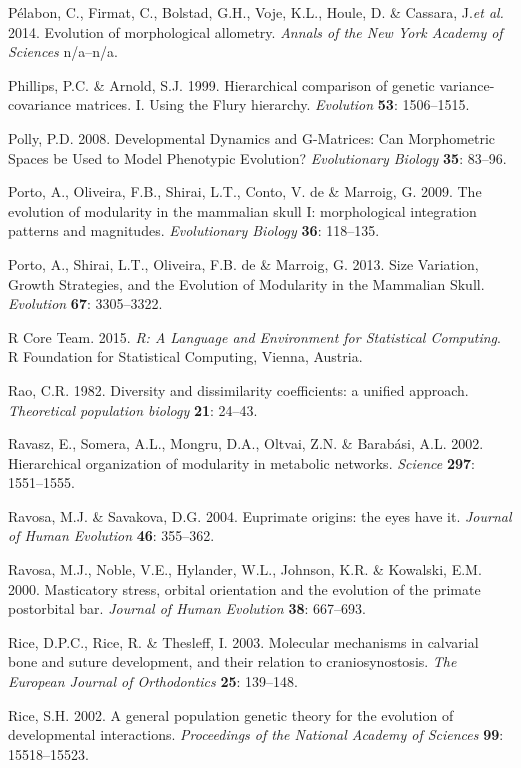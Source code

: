 \documentclass[12pt,twoside]{report}
\begin{document}
Pélabon, C., Firmat, C., Bolstad, G.H., Voje, K.L., Houle, D. \&
Cassara, J.\emph{et al.} 2014. Evolution of morphological allometry.
\emph{Annals of the New York Academy of Sciences} n/a--n/a.

Phillips, P.C. \& Arnold, S.J. 1999. Hierarchical comparison of genetic
variance-covariance matrices. I. Using the Flury hierarchy.
\emph{Evolution} \textbf{53}: 1506--1515.

Polly, P.D. 2008. Developmental Dynamics and G-Matrices: Can
Morphometric Spaces be Used to Model Phenotypic Evolution?
\emph{Evolutionary Biology} \textbf{35}: 83--96.

Porto, A., Oliveira, F.B., Shirai, L.T., Conto, V. de \& Marroig, G.
2009. The evolution of modularity in the mammalian skull I:
morphological integration patterns and magnitudes. \emph{Evolutionary
Biology} \textbf{36}: 118--135.

Porto, A., Shirai, L.T., Oliveira, F.B. de \& Marroig, G. 2013. Size
Variation, Growth Strategies, and the Evolution of Modularity in the
Mammalian Skull. \emph{Evolution} \textbf{67}: 3305--3322.

R Core Team. 2015. \emph{R: A Language and Environment for Statistical
Computing}. R Foundation for Statistical Computing, Vienna, Austria.

Rao, C.R. 1982. Diversity and dissimilarity coefficients: a unified
approach. \emph{Theoretical population biology} \textbf{21}: 24--43.

Ravasz, E., Somera, A.L., Mongru, D.A., Oltvai, Z.N. \& Barabási, A.L.
2002. Hierarchical organization of modularity in metabolic networks.
\emph{Science} \textbf{297}: 1551--1555.

Ravosa, M.J. \& Savakova, D.G. 2004. Euprimate origins: the eyes have
it. \emph{Journal of Human Evolution} \textbf{46}: 355--362.

Ravosa, M.J., Noble, V.E., Hylander, W.L., Johnson, K.R. \& Kowalski,
E.M. 2000. Masticatory stress, orbital orientation and the evolution of
the primate postorbital bar. \emph{Journal of Human Evolution}
\textbf{38}: 667--693.

Rice, D.P.C., Rice, R. \& Thesleff, I. 2003. Molecular mechanisms in
calvarial bone and suture development, and their relation to
craniosynostosis. \emph{The European Journal of Orthodontics}
\textbf{25}: 139--148.

Rice, S.H. 2002. A general population genetic theory for the evolution
of developmental interactions. \emph{Proceedings of the National Academy
of Sciences} \textbf{99}: 15518--15523.
\end{document}
